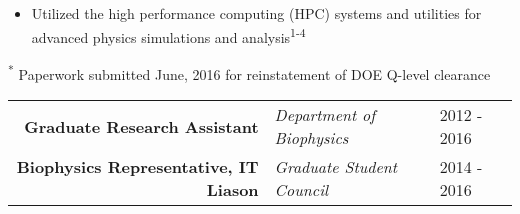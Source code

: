 \begin{minipage}{\textwidth}
\begin{center}
\begin{itemize}
	    \item Utilized the high performance computing (HPC) systems and utilities for advanced physics simulations and analysis\textsuperscript{1-4}
	\end{itemize}
    \end{center}
\end{minipage}

\begin{minipage}{\textwidth}
\begin{center}
\footnotesize \textsuperscript{*} Paperwork submitted June, 2016 for reinstatement of DOE Q-level clearance
\end{center}
\end{minipage}


\begin{minipage}{\textwidth}
	\begin{center}
		\begin{tabular}{rll}
			\textbf{Graduate Research Assistant} & \textit{Department of Biophysics}\none & 2012 - 2016 \\
			\textbf{Biophysics Representative, IT Liason} & \textit{Graduate Student Council}\ntwo & 2014 - 2016 \\
		\end{tabular}
	\end{center}
\end{minipage}

